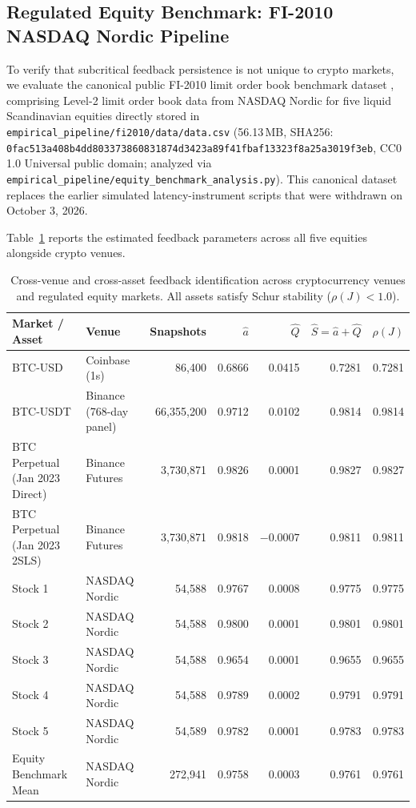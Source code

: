 \documentclass[11pt,a4paper]{article}
\theoremstyle{definition}\newtheorem{definition}[theorem]{Definition}
\theoremstyle{remark}\newtheorem{remark}[theorem]{Remark}
\begin{document}
\subsection{Regulated Equity Benchmark: FI-2010 NASDAQ Nordic Pipeline}
\label{sec:supp_equity_benchmark}
To verify that subcritical feedback persistence is not unique to crypto markets, we evaluate the canonical public FI-2010 limit order book benchmark dataset \cite{ntakaris2018benchmark}, comprising Level-2 limit order book data from NASDAQ Nordic for five liquid Scandinavian equities directly stored in \nolinkurl{empirical_pipeline/fi2010/data/data.csv} (56.13\,MB, SHA256: \nolinkurl{0fac513a408b4dd803373860831874d3423a89f41fbaf13323f8a25a3019f3eb}, CC0 1.0 Universal public domain; analyzed via \nolinkurl{empirical_pipeline/equity_benchmark_analysis.py}). This canonical dataset replaces the earlier simulated latency-instrument scripts that were withdrawn on October 3, 2026.

Table~\ref{tab:supp_cross_market} reports the estimated feedback parameters across all five equities alongside crypto venues.

\begin{table}[htbp]
\centering\footnotesize\setlength{\tabcolsep}{3.5pt}
\caption{Cross-venue and cross-asset feedback identification across cryptocurrency venues and regulated equity markets. All assets satisfy Schur stability ($\rho(J) < 1.0$).}
\label{tab:supp_cross_market}
\begin{tabular}{llrrrrr}
\toprule
Market / Asset & Venue & Snapshots & $\hat a$ & $\hat Q$ & $\hat S = \hat a + \hat Q$ & $\rho(J)$ \\
\midrule
BTC-USD & Coinbase (1s) & 86,400 & 0.6866 & 0.0415 & 0.7281 & 0.7281 \\
BTC-USDT & Binance (768-day panel) & 66,355,200 & 0.9712 & 0.0102 & 0.9814 & 0.9814 \\
BTC Perpetual (Jan 2023 Direct) & Binance Futures & 3,730,871 & 0.9826 & 0.0001 & 0.9827 & 0.9827 \\
BTC Perpetual (Jan 2023 2SLS) & Binance Futures & 3,730,871 & 0.9818 & $-0.0007$ & 0.9811 & 0.9811 \\
\midrule
Stock 1 & NASDAQ Nordic & 54,588 & 0.9767 & 0.0008 & 0.9775 & 0.9775 \\
Stock 2 & NASDAQ Nordic & 54,588 & 0.9800 & 0.0001 & 0.9801 & 0.9801 \\
Stock 3 & NASDAQ Nordic & 54,588 & 0.9654 & 0.0001 & 0.9655 & 0.9655 \\
Stock 4 & NASDAQ Nordic & 54,588 & 0.9789 & 0.0002 & 0.9791 & 0.9791 \\
Stock 5 & NASDAQ Nordic & 54,589 & 0.9782 & 0.0001 & 0.9783 & 0.9783 \\
\midrule
Equity Benchmark Mean & NASDAQ Nordic & 272,941 & 0.9758 & 0.0003 & 0.9761 & 0.9761 \\
\bottomrule
\end{tabular}
\end{table}
\end{document}
